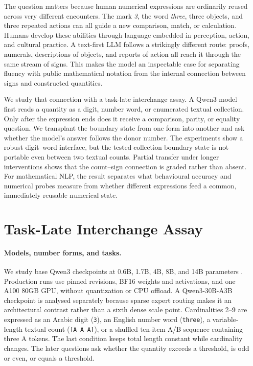 \documentclass[11pt]{article}
\begin{document}
The question matters because human numerical expressions are ordinarily
reused across very different encounters. The mark \emph{3}, the word
\emph{three}, three objects, and three repeated actions can all guide a new
comparison, match, or calculation. Humans develop these abilities through
language embedded in perception, action, and cultural practice. A text-first
LLM follows a strikingly different route: proofs, numerals, descriptions of
objects, and reports of action all reach it through the same stream of signs.
This makes the model an inspectable case for separating fluency with public
mathematical notation from the internal connection between signs and
constructed quantities.


We study that connection with a task-late interchange assay. A Qwen3 model
first reads a quantity as a digit, number word, or enumerated textual
collection. Only after the expression ends does it receive a comparison,
parity, or equality question. We transplant the boundary state from one form
into another and ask whether the model's answer follows the donor number. The
experiments show a robust digit--word interface, but the tested
collection-boundary state is not portable even between two textual counts.
Partial transfer under longer interventions shows that the count--sign
connection is graded rather than absent. For mathematical NLP, the result
separates what behavioural accuracy and numerical probes measure from whether
different expressions feed a common, immediately reusable numerical state.

\section{Task-Late Interchange Assay}

\paragraph{Models, number forms, and tasks.}

We study base Qwen3 checkpoints at 0.6B, 1.7B, 4B, 8B, and 14B parameters
\citep{yang2025qwen3}. Production runs use pinned revisions, BF16 weights and
activations, and one A100 80GB GPU, without quantization or CPU offload. A
Qwen3-30B-A3B checkpoint is analysed separately because sparse expert routing
makes it an architectural contrast rather than a sixth dense scale point.
Cardinalities 2--9 are expressed as an Arabic digit (\texttt{3}), an English
number word (\texttt{three}), a variable-length textual count
(\texttt{[A A A]}), or a shuffled ten-item A/B sequence containing three A
tokens. The last condition keeps total length constant while cardinality
changes. The later questions ask whether the quantity exceeds a threshold,
is odd or even, or equals a threshold.
\end{document}
